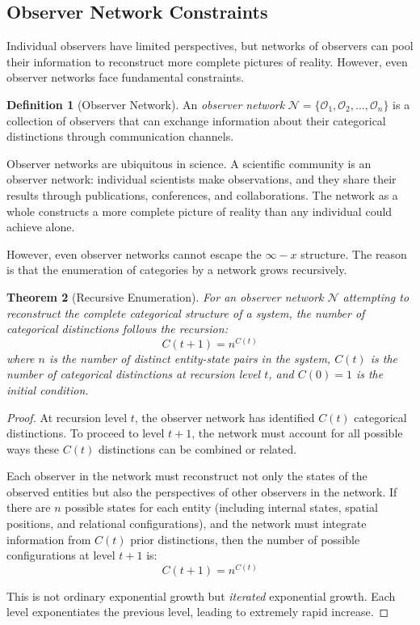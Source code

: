 \documentclass[12pt,a4paper]{article}
\newtheorem{theorem}{Theorem}[section]
\theoremstyle{definition}
\newtheorem{definition}[theorem]{Definition}
\theoremstyle{remark}
\begin{document}
\subsection{Observer Network Constraints}

Individual observers have limited perspectives, but networks of observers can pool their information to reconstruct more complete pictures of reality. However, even observer networks face fundamental constraints.

\begin{definition}[Observer Network]
\label{def:observer_network}
An \emph{observer network} $\mathcal{N} = \{\mathcal{O}_1, \mathcal{O}_2, \ldots, \mathcal{O}_n\}$ is a collection of observers that can exchange information about their categorical distinctions through communication channels.
\end{definition}

Observer networks are ubiquitous in science. A scientific community is an observer network: individual scientists make observations, and they share their results through publications, conferences, and collaborations. The network as a whole constructs a more complete picture of reality than any individual could achieve alone.

However, even observer networks cannot escape the $\infty - x$ structure. The reason is that the enumeration of categories by a network grows recursively.

\begin{theorem}[Recursive Enumeration]
\label{thm:recursive_enumeration}
For an observer network $\mathcal{N}$ attempting to reconstruct the complete categorical structure of a system, the number of categorical distinctions follows the recursion:
\begin{equation}
C(t+1) = n^{C(t)}
\end{equation}
where $n$ is the number of distinct entity-state pairs in the system, $C(t)$ is the number of categorical distinctions at recursion level $t$, and $C(0) = 1$ is the initial condition.
\end{theorem}

\begin{proof}
At recursion level $t$, the observer network has identified $C(t)$ categorical distinctions. To proceed to level $t+1$, the network must account for all possible ways these $C(t)$ distinctions can be combined or related.

Each observer in the network must reconstruct not only the states of the observed entities but also the perspectives of other observers in the network. If there are $n$ possible states for each entity (including internal states, spatial positions, and relational configurations), and the network must integrate information from $C(t)$ prior distinctions, then the number of possible configurations at level $t+1$ is:
\begin{equation}
C(t+1) = n^{C(t)}
\end{equation}

This is not ordinary exponential growth but \emph{iterated} exponential growth. Each level exponentiates the previous level, leading to extremely rapid increase.
\end{proof}
\end{document}
